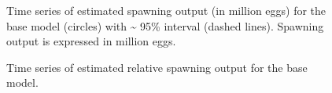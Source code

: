 \documentclass[
]{scrartcl}
\begin{document}
\begin{figure}[H]


\caption{\label{fig-es-so}Time series of estimated spawning output (in
million eggs) for the base model (circles) with \textasciitilde{} 95\%
interval (dashed lines). Spawning output is expressed in million eggs.}

\end{figure}%

\begin{figure}[H]


\caption{\label{fig-es-sb}Time series of estimated relative spawning
output for the base model.}

\end{figure}%
\end{document}
